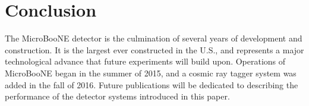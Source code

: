 \section{Conclusion}
\label{sec:conclusion}

The MicroBooNE detector is the culmination of several years of development and construction.  It is the largest \lartpc ever constructed in the U.S., and represents a major technological advance that future experiments will build upon.  Operations of MicroBooNE began in the summer of 2015, and a cosmic ray tagger system was added in the fall of 2016.  Future publications will be dedicated to describing the performance of the detector systems introduced in this paper.